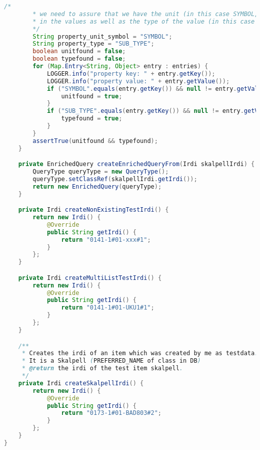 \begin{lstlisting}[caption=Beispiel eines Integrationstests, language=Java, label=lst:integrationstest_beispiel]
        /*
        * we need to assure that we have the unit (in this case SYMBOL, e.g. mm or m or cm)
        * in the values as well as the type of the value (in this case real_measure_type)
        */
        String property_unit_symbol = "SYMBOL";
        String property_type = "SUB_TYPE";
        boolean unitfound = false;
        boolean typefound = false;
        for (Map.Entry<String, Object> entry : entries) {
            LOGGER.info("property key: " + entry.getKey());
            LOGGER.info("property value: " + entry.getValue());
            if ("SYMBOL".equals(entry.getKey()) && null != entry.getValue() && !"null".equals(entry.getValue())) {
                unitfound = true;
            }
            if ("SUB_TYPE".equals(entry.getKey()) && null != entry.getValue() && !"null".equals(entry.getValue())) {
                typefound = true;
            }
        }
        assertTrue(unitfound && typefound);
    }

    private EnrichedQuery createEnrichedQueryFrom(Irdi skalpellIrdi) {
        QueryType queryType = new QueryType();
        queryType.setClassRef(skalpellIrdi.getIrdi());
        return new EnrichedQuery(queryType);
    }

    private Irdi createNonExistingTestIrdi() {
        return new Irdi() {
            @Override
            public String getIrdi() {
                return "0141-1#01-xxx#1";
            }
        };
    }

    private Irdi createMultiListTestIrdi() {
        return new Irdi() {
            @Override
            public String getIrdi() {
                return "0141-1#01-UKU1#1";
            }
        };
    }

    /**
     * Creates the irdi of an item which was created by me as testdata.
     * It is a Skalpell (PREFERRED_NAME of class in DB)
     * @return the irdi of the test item skalpell.
     */
    private Irdi createSkalpellIrdi() {
        return new Irdi() {
            @Override
            public String getIrdi() {
                return "0173-1#01-BAD803#2";
            }
        };
    }
}

\end{lstlisting}  
   